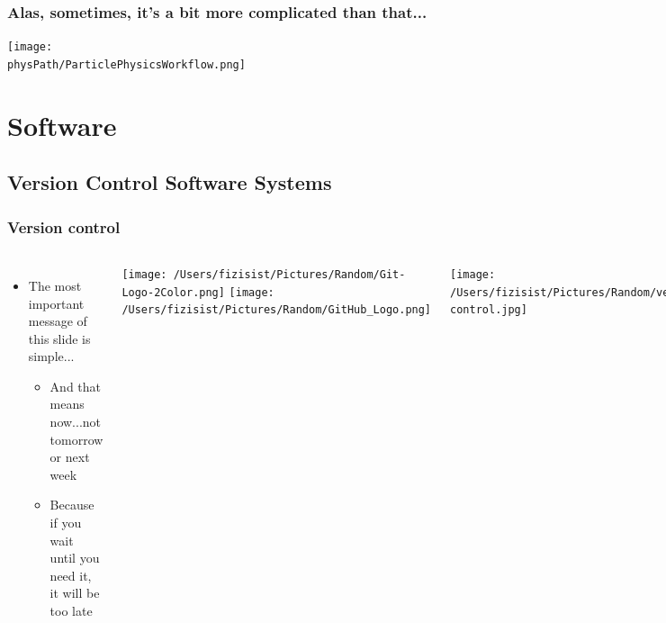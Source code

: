 \documentclass[hyperref={colorlinks=true}]{beamer}
\begin{document}

\begin{frame}%
  \frametitle{Alas, sometimes, it's a bit more complicated than that...}
  
  \texttt{[image: \\physPath/ParticlePhysicsWorkflow.png]}

\end{frame}

\section[Software]{Software}

\subsection[Version Control Software Systems]{Version Control Software Systems}

\begin{frame}%
  \frametitle{Version control}
  
  \begin{columns}
  
    
      \begin{itemize}
        \item The most important message of this slide is simple...
        \begin{itemize}
          \item And that means now...not tomorrow or next week
          \item Because if you wait until you need it, it will be too late
        \end{itemize}
      \end{itemize}
      
      \pause
      
      \centering
      
      \texttt{[image: /Users/fizisist/Pictures/Random/Git-Logo-2Color.png]}
      \texttt{[image: /Users/fizisist/Pictures/Random/GitHub\_Logo.png]}
    
    
      \texttt{[image: /Users/fizisist/Pictures/Random/version-control.jpg]}
  
  \end{columns}

\end{frame}
\end{document}
